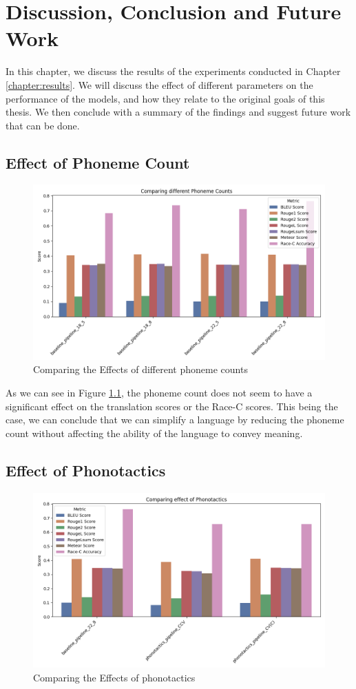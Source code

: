 \chapter{Discussion, Conclusion and Future Work}\label{chapter:discussion}

In this chapter, we discuss the results of the experiments conducted in Chapter \ref{chapter:results}. We will discuss the effect of different parameters on the performance of the models, 
and how they relate to the original goals of this thesis. We then conclude with a summary of the findings and suggest future work that can be done.

\section{Effect of Phoneme Count}

\begin{figure}[H]  
    \centering
    \includegraphics[width=0.7\linewidth]{figures/results/1_effect_of_phoneme_count.png}
    \caption{Comparing the Effects of different phoneme counts}
    \label{fig:compare-phoneme-count}
\end{figure}

As we can see in Figure \ref{fig:compare-phoneme-count}, the phoneme count does not seem to have a significant effect on the translation scores
or the Race-C scores. This being the case, we can conclude that we can simplify a language by reducing the phoneme count without affecting the 
ability of the language to convey meaning. 

\section{Effect of Phonotactics}

\begin{figure}[H]  
    \centering
    \includegraphics[width=0.7\linewidth]{figures/results/1_effect_of_phonotactics.png}
    \caption{Comparing the Effects of phonotactics}
    \label{fig:compare-phonotactics}
\end{figure}

